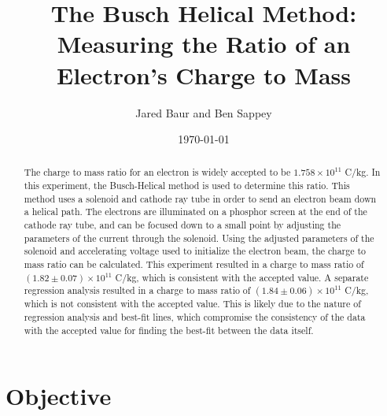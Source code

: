 \documentclass[%
 aip,
 amsmath,amssymb,
 reprint,%
floatfix,
]{revtex4-1}
\begin{document}

\title[]{The Busch Helical Method: \\ Measuring the Ratio of an Electron's Charge to Mass}

\author{Jared Baur and Ben Sappey}

\date{\today}%


\begin{abstract}

	The charge to mass ratio for an electron is widely accepted to be $1.758 \times 10^{11}$ C/kg. In this experiment, the Busch-Helical method is used to determine this ratio. This method uses a solenoid and cathode ray tube in order to send an electron beam down a helical path. The electrons are illuminated on a phosphor screen at the end of the cathode ray tube, and can be focused down to a small point by adjusting the parameters of the current through the solenoid. Using the adjusted parameters of the solenoid and accelerating voltage used to initialize the electron beam, the charge to mass ratio can be calculated. This experiment resulted in a charge to mass ratio of $(1.82 \pm 0.07) \times 10^{11}$ C/kg, which is consistent with the accepted value. A separate regression analysis resulted in a charge to mass ratio of $(1.84 \pm 0.06) \times 10^{11}$ C/kg, which is not consistent with the accepted value. This is likely due to the nature of regression analysis and best-fit lines, which compromise the consistency of the data with the accepted value for finding the best-fit between the data itself.

\end{abstract}

\maketitle


\onecolumngrid

\section{\label{sec:level1}Objective}
\end{document}
